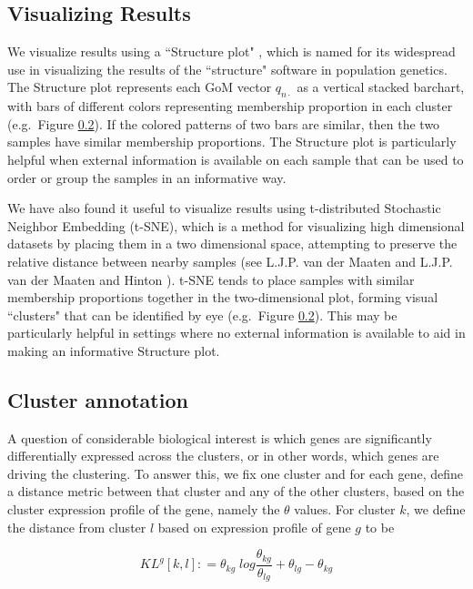 \subsection{Visualizing Results}

We visualize results using a ``Structure plot" \cite{Rosenberg2002}, 
which is named for its widespread use in visualizing the
results of the ``structure" software \cite{PritchardEtAl} in population genetics.
The Structure plot represents each GoM vector $q_{n\cdot}$
as  a vertical stacked barchart, with bars of different colors representing membership proportion in each cluster (e.g.~Figure \ref{}). If the colored patterns of two bars are similar, then the two samples have similar membership proportions.  The Structure plot is particularly helpful when external information is available on each sample that can be used to order or group the samples in an informative way.

We have also found it useful to visualize results using t-distributed Stochastic Neighbor Embedding (t-SNE), which is a method for visualizing high dimensional datasets by placing them in a two dimensional space, attempting to preserve the relative distance between nearby samples (see L.J.P. van der Maaten \cite{Maaten2014} and L.J.P. van der Maaten and Hinton \cite{Maaten2008}). t-SNE tends to place samples with similar membership proportions together in the two-dimensional plot, forming visual ``clusters" that can be identified by eye (e.g.~Figure \ref{}). This may be particularly helpful in settings where no external information is available to aid in making an informative Structure plot. 


\subsection{Cluster annotation}

A question of considerable biological interest is which genes are significantly differentially expressed across the clusters, or in other words, which genes are driving the clustering. To answer this, we fix one cluster and for each gene, define a distance metric between that cluster and any of the other clusters, based on the cluster expression profile of the gene, namely the $\theta$ values. For cluster $k$, we define the distance from cluster $l$ based on expression profile of gene $g$ to be 

$$ KL^{g} [k,l] : = \theta_{kg} \; log \frac{\theta_{kg}}{\theta_{lg}} + \theta_{lg} - \theta_{kg} $$

